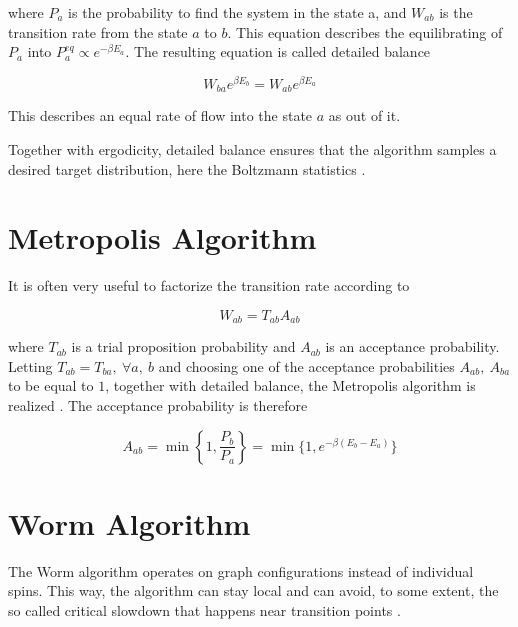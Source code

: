 \noindent where $P_a$ is the probability to find the system in the state a, and $W_{ab}$ is the transition rate from the state $a$ to $b$. This equation describes the equilibrating of $P_a$ into $P_a^{eq} \propto e^{-\beta E_a}$. The resulting equation is called detailed balance

\begin{equation}
    W_{ba} e^{\beta E_b} = W_{ab} e^{\beta E_a}
\end{equation}

This describes an equal rate of flow into the state $a$ as out of it.

Together with ergodicity, detailed balance ensures that the algorithm samples a desired target distribution, here the Boltzmann statistics \cite{Walter:IntroToMC}.

\section{Metropolis Algorithm}
\label{sec:MetropolisAlgorithm}

It is often very useful to factorize the transition rate according to

\begin{equation}
    W_{ab} = T_{ab} A_{ab}
\end{equation}

\noindent where $T_{ab}$ is a trial proposition probability and $A_{ab}$ is an acceptance probability. Letting $T_{ab} = T_{ba}, \ \forall a, \ b$ and choosing one of the acceptance probabilities $A_{ab}, \ A_{ba}$ to be equal to $1$, together with detailed balance, the Metropolis algorithm is realized \cite{Walter:IntroToMC}. The acceptance probability is therefore

\begin{equation}
    A_{ab} = \min \left \{ 1, \frac{P_b}{P_a} \right \} = \min \{ 1, e^{-\beta(E_b - E_a )} \}
\end{equation}


\section{Worm Algorithm}
\label{sec:WormAlgorithm}

The Worm algorithm operates on graph configurations instead of individual spins. This way, the algorithm can stay local and can avoid, to some extent, the so called critical slowdown that happens near transition points \cite{Prokofev:first_worm_algorithm}.

